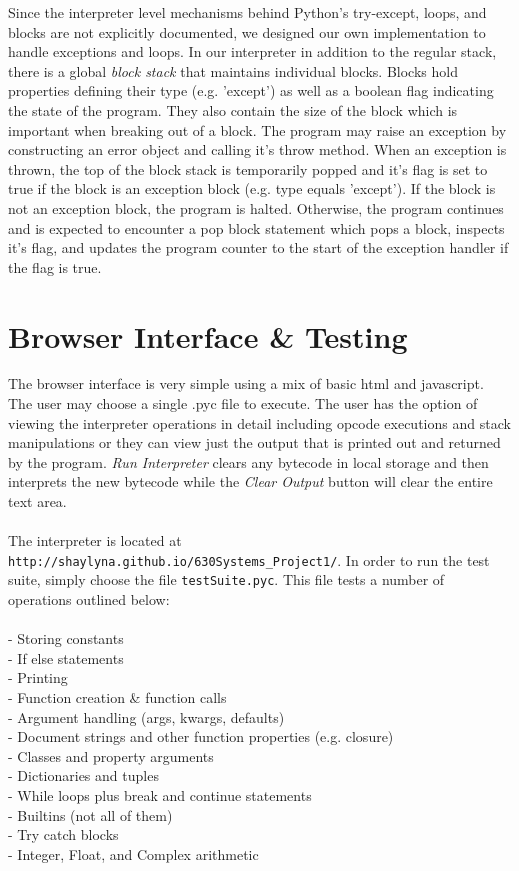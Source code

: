 \documentclass{article}
\begin{document}
Since the interpreter level mechanisms behind Python's try-except, loops, and blocks are not explicitly documented, we designed our own implementation to handle exceptions and loops.  In our interpreter in addition to the regular stack, there is a global {\em block stack} that maintains individual blocks. Blocks hold properties defining their type (e.g. 'except') as well as a boolean flag indicating the state of the program. They also contain the size of the block which is important when breaking out of a block. The program may raise an exception by constructing an error object and calling it's throw method. When an exception is thrown, the top of the block stack is temporarily popped and it's flag is set to true if the block is an exception block (e.g. type equals 'except').  If the block is not an exception block, the program is halted.  Otherwise, the program continues and is expected to encounter a pop block statement which pops a block, inspects it's flag, and updates the program counter to the start of the exception handler if the flag is true.

\section{Browser Interface \& Testing}

The browser interface is very simple using a mix of basic html and javascript.  The user may choose a single .pyc file to execute. The user has the option of viewing the interpreter operations in detail including opcode executions and stack manipulations or they can view just the output that is printed out and returned by the program.  {\em Run Interpreter} clears any bytecode in local storage and then interprets the new bytecode while the {\em Clear Output} button will clear the entire text area.\\
\\
The interpreter is located at \verb!http://shaylyna.github.io/630Systems_Project1/!.  In order to run the test suite, simply choose the file \verb!testSuite.pyc!.  This file tests a number of operations outlined below:\\
\\
- Storing constants\\
- If else statements\\
- Printing\\
- Function creation \& function calls\\
- Argument handling (args, kwargs, defaults)\\
- Document strings and other function properties (e.g. closure)\\
- Classes and property arguments\\
- Dictionaries and tuples\\
- While loops plus break and continue statements\\
- Builtins (not all of them)\\
- Try catch blocks\\
- Integer, Float, and Complex arithmetic\\
\end{document}
